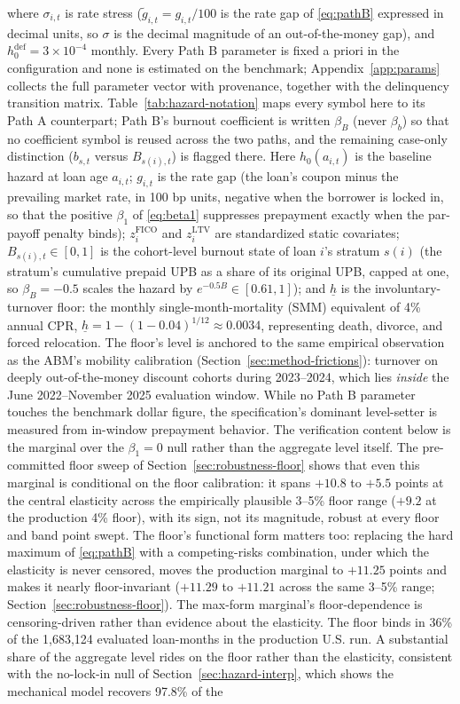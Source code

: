 \documentclass[12pt]{article}
\begin{document}
where $\sigma_{i,t}$ is rate stress ($\tilde g_{i,t} = g_{i,t}/100$ is the rate gap of \eqref{eq:pathB} expressed in decimal units, so $\sigma$ is the decimal magnitude of an out-of-the-money gap), and $h^{\mathrm{def}}_0 = 3\times10^{-4}$ monthly. Every Path B parameter is fixed a priori in the configuration and none is estimated on the benchmark; Appendix~\ref{app:params} collects the full parameter vector with provenance, together with the delinquency transition matrix. Table~\ref{tab:hazard-notation} maps every symbol here to its Path A counterpart; Path B's burnout coefficient is written $\beta_B$ (never $\beta_b$) so that no coefficient symbol is reused across the two paths, and the remaining case-only distinction ($b_{s,t}$ versus $B_{s(i),t}$) is flagged there. Here $h_0(a_{i,t})$ is the baseline hazard at loan age $a_{i,t}$; $g_{i,t}$ is the rate gap (the loan's coupon minus the prevailing market rate, in 100 bp units, negative when the borrower is locked in, so that the positive $\beta_1$ of \eqref{eq:beta1} suppresses prepayment exactly when the par-payoff penalty binds); $z^{\mathrm{FICO}}_{i}$ and $z^{\mathrm{LTV}}_{i}$ are standardized static covariates; $B_{s(i),t} \in [0,1]$ is the cohort-level burnout state of loan $i$'s stratum $s(i)$ (the stratum's cumulative prepaid UPB as a share of its original UPB, capped at one, so $\beta_B = -0.5$ scales the hazard by $e^{-0.5 B} \in [0.61, 1]$); and $\underline{h}$ is the involuntary-turnover floor: the monthly single-month-mortality (SMM) equivalent of 4\% annual CPR, $\underline{h} = 1-(1-0.04)^{1/12} \approx 0.0034$, representing death, divorce, and forced relocation. The floor's level is anchored to the same empirical observation as the ABM's mobility calibration (Section~\ref{sec:method-frictions}): turnover on deeply out-of-the-money discount cohorts during 2023--2024, which lies \emph{inside} the June 2022--November 2025 evaluation window. While no Path B parameter touches the benchmark dollar figure, the specification's dominant level-setter is measured from in-window prepayment behavior. The verification content below is the marginal over the $\beta_1 = 0$ null rather than the aggregate level itself. The pre-committed floor sweep of Section~\ref{sec:robustness-floor} shows that even this marginal is conditional on the floor calibration: it spans $+10.8$ to $+5.5$ points at the central elasticity across the empirically plausible 3--5\% floor range ($+9.2$ at the production 4\% floor), with its sign, not its magnitude, robust at every floor and band point swept. The floor's functional form matters too: replacing the hard maximum of \eqref{eq:pathB} with a competing-risks combination, under which the elasticity is never censored, moves the production marginal to $+11.25$ points and makes it nearly floor-invariant ($+11.29$ to $+11.21$ across the same 3--5\% range; Section~\ref{sec:robustness-floor}). The max-form marginal's floor-dependence is censoring-driven rather than evidence about the elasticity. The floor binds in 36\% of the 1,683,124 evaluated loan-months in the production U.S. run. A substantial share of the aggregate level rides on the floor rather than the elasticity, consistent with the no-lock-in null of Section~\ref{sec:hazard-interp}, which shows the mechanical model recovers 97.8\% of the 
\end{document}
